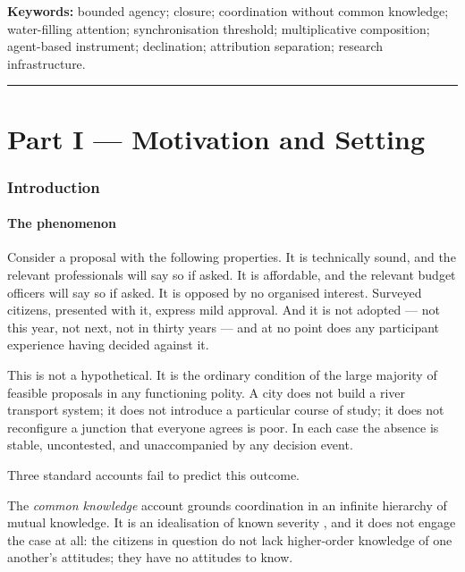 \documentclass[11pt,a4paper]{article}
\theoremstyle{clstyle}
\theoremstyle{definition}
\theoremstyle{remark}
\begin{document}
\noindent\textbf{Keywords:} bounded agency; closure; coordination without
common knowledge; water-filling attention; synchronisation threshold;
multiplicative composition; agent-based instrument; declination; attribution
separation; research infrastructure.

\vspace{4pt}
\tableofcontents
\vspace{6pt}
\hrule

\part*{Part I --- Motivation and Setting}

\section{Introduction}
\label{sec:intro}

\subsection{The phenomenon}

Consider a proposal with the following properties. It is technically sound,
and the relevant professionals will say so if asked. It is affordable, and
the relevant budget officers will say so if asked. It is opposed by no
organised interest. Surveyed citizens, presented with it, express mild
approval. And it is not adopted --- not this year, not next, not in thirty
years --- and at no point does any participant experience having decided
against it.

This is not a hypothetical. It is the ordinary condition of the large
majority of feasible proposals in any functioning polity. A city does not
build a river transport system; it does not introduce a particular course of
study; it does not reconfigure a junction that everyone agrees is poor. In
each case the absence is stable, uncontested, and unaccompanied by any
decision event.

Three standard accounts fail to predict this outcome.

The \emph{common knowledge} account
\citep{lewis1969convention,schelling1960strategy,aumann1976agreeing} grounds
coordination in an infinite hierarchy of mutual knowledge. It is an
idealisation of known severity \citep{fagin1995reasoning}, and it does not
engage the case at all: the citizens in question do not lack higher-order
knowledge of one another's attitudes; they have no attitudes to know.
\end{document}
